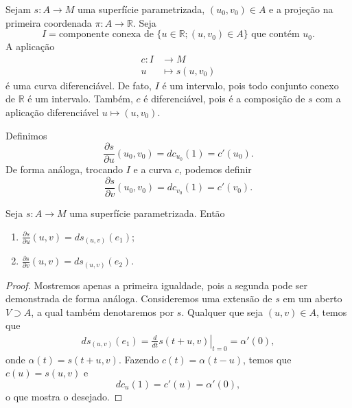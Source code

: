 \begin{definition}
    \label{def:derivadas-superficie}
    Sejam $s:A\to M$ uma superfície parametrizada, $(u_{0},v_{0})\in A$ e a projeção na primeira coordenada $\pi:A\to \mathbb{R}$. Seja
    $$I=\text{componente conexa de } \{ u \in \mathbb{R}; (u, v_0) \in A \} \text{ que contém } u_0.$$
    A aplicação
    \begin{align*}
        c:I & \longrightarrow M      \\
        u   & \longmapsto s(u,v_{0})
    \end{align*}
    é uma curva diferenciável. De fato, $I$ é um intervalo, pois todo conjunto conexo de $\mathbb{R}$ é um intervalo. Também, $c$ é diferenciável, pois é a composição de $s$ com a aplicação diferenciável $u \mapsto (u, v_{0})$.

    Definimos
    \begin{equation*}
        \frac{\partial s}{\partial u}(u_{0},v_{0})=dc_{u_{0}}(1)=c'(u_{0}).
    \end{equation*}
    De forma análoga, trocando $I$ e a curva $c$, podemos definir
    \begin{equation*}
        \frac{\partial s}{\partial v}(u_{0},v_{0})=dc_{v_{0}}(1)=c'(v_{0}).
    \end{equation*}
\end{definition}
\begin{lemma}
    \label{lem:equivalencia-parciais-superficie}
    Seja $s:A\to M$ uma superfície parametrizada. Então
    \begin{enumerate}[label=(\roman*)]
        \item $\frac{\partial s}{\partial u}(u,v)=ds_{(u,v)}(e_{1})$;
        \item $\frac{\partial s}{\partial v}(u,v)=ds_{(u,v)}(e_{2})$.
    \end{enumerate}
    \begin{proof}

        Mostremos apenas a primeira igualdade, pois a segunda pode ser demonstrada de forma análoga. Consideremos uma extensão de $s$ em um aberto $V\supset A$, a qual também denotaremos por $s$. Qualquer que seja $(u,v)\in A$, temos que
        \begin{align*}
            ds_{(u,v)}(e_{1})=\left.\frac{d}{dt}s(t +u,v)\right|_{t=0} =\alpha'(0),
        \end{align*}
        onde $\alpha(t)=s(t+u,v)$.
        Fazendo $c(t)=\alpha(t-u)$, temos que $c(u)=s(u,v)$ e
        \begin{equation*}
            dc_{u}(1)=c'(u)=\alpha'(0),
        \end{equation*}
        o que mostra o desejado.
    \end{proof}
\end{lemma}
